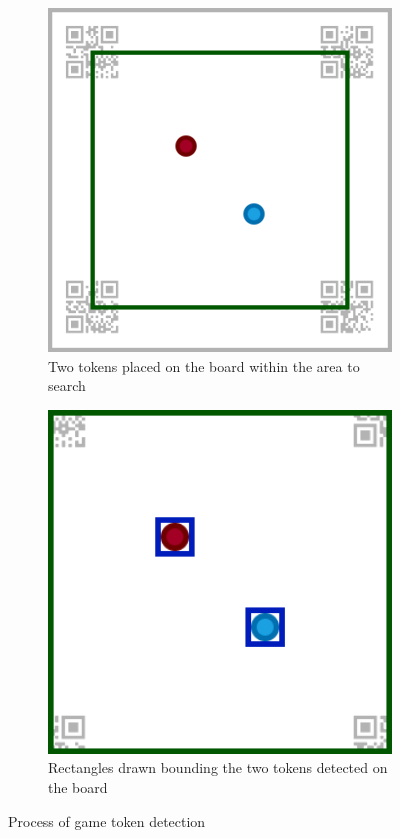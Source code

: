 \documentclass[12pt]{article}
\begin{document}
\begin{figure}[H]
    \centering
    \begin{subfigure}{0.4\textwidth}
        \includegraphics[width=1\textwidth]{images/figures/fig5a}
        \caption{Two tokens placed on the board within the area to search}
        \label{fig:tokendetectiona}
    \end{subfigure}
    \begin{subfigure}{0.4\textwidth}
        \includegraphics[width=1\textwidth]{images/figures/fig5b}
        \caption{Rectangles drawn bounding the two tokens detected on the board}
        \label{fig:tokendetectionb}
    \end{subfigure}
    \caption{Process of game token detection}
    \label{fig:tokendetection}
\end{figure}
\end{document}
